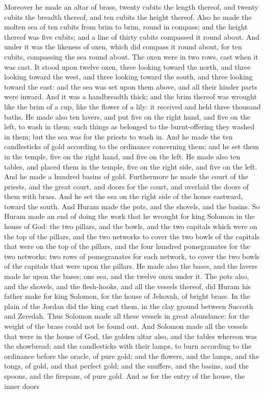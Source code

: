 Moreover he made an altar of brass, twenty cubits the length thereof, and twenty cubits the breadth thereof, and ten cubits the height thereof. Also he made the molten sea of ten cubits from brim to brim, round in compass; and the height thereof was five cubits; and a line of thirty cubits compassed it round about. And under it was the likeness of oxen, which did compass it round about, for ten cubits, compassing the sea round about. The oxen were in two rows, cast when it was cast. It stood upon twelve oxen, three looking toward the north, and three looking toward the west, and three looking toward the south, and three looking toward the east: and the sea was set upon them above, and all their hinder parts were inward. And it was a handbreadth thick; and the brim thereof was wrought like the brim of a cup, like the flower of a lily: it received and held three thousand baths. He made also ten lavers, and put five on the right hand, and five on the left, to wash in them; such things as belonged to the burnt-offering they washed in them; but the sea was for the priests to wash in.  And he made the ten candlesticks of gold according to the ordinance concerning them; and he set them in the temple, five on the right hand, and five on the left. He made also ten tables, and placed them in the temple, five on the right side, and five on the left. And he made a hundred basins of gold. Furthermore he made the court of the priests, and the great court, and doors for the court, and overlaid the doors of them with brass. And he set the sea on the right side of the house eastward, toward the south. And Huram made the pots, and the shovels, and the basins. So Huram made an end of doing the work that he wrought for king Solomon in the house of God: the two pillars, and the bowls, and the two capitals which were on the top of the pillars, and the two networks to cover the two bowls of the capitals that were on the top of the pillars, and the four hundred pomegranates for the two networks; two rows of pomegranates for each network, to cover the two bowls of the capitals that were upon the pillars. He made also the bases, and the lavers made he upon the bases; one sea, and the twelve oxen under it. The pots also, and the shovels, and the flesh-hooks, and all the vessels thereof, did Huram his father make for king Solomon, for the house of Jehovah, of bright brass. In the plain of the Jordan did the king cast them, in the clay ground between Succoth and Zeredah. Thus Solomon made all these vessels in great abundance: for the weight of the brass could not be found out.  And Solomon made all the vessels that were in the house of God, the golden altar also, and the tables whereon was the showbread; and the candlesticks with their lamps, to burn according to the ordinance before the oracle, of pure gold; and the flowers, and the lamps, and the tongs, of gold, and that perfect gold; and the snuffers, and the basins, and the spoons, and the firepans, of pure gold. And as for the entry of the house, the inner doors 